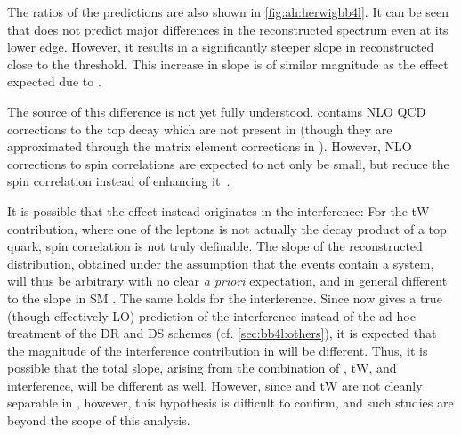 The ratios of the predictions are also shown in \cref{fig:ah:herwigbb4l}. It can be seen that \bbfourl does not predict major differences in the reconstructed \mtt spectrum even at its lower edge. However, it results in a significantly steeper slope in reconstructed \chel close to the threshold. This increase in slope is of similar magnitude as the effect expected due to \etat. 

The source of this difference is not yet fully understood. \bbfourl contains NLO QCD corrections to the top decay which are not present in \hvq (though they are approximated through the matrix element corrections in \pythia). However, NLO corrections to spin correlations are expected to not only be small, but reduce the spin correlation instead of enhancing it~\cite{Bernreuther:2004jv}. 

It is possible that the effect instead originates in the \tttW interference:
For the tW contribution, where one of the leptons is not actually the decay product of a top quark, \ttbar spin correlation is not truly definable. The slope of the reconstructed \chel distribution, obtained under the assumption that the events contain a \ttbar system, will thus be arbitrary with no clear \textit{a priori} expectation, and in general different to the slope in SM \ttbar. The same holds for the \tttW interference. Since \bbfourl now gives a true (though effectively LO) prediction of the \tttW interference instead of the ad-hoc treatment of the DR and DS schemes (cf. \cref{sec:bb4l:others}), it is expected that the magnitude of the interference contribution in \bbfourl will be different. Thus, it is possible that the total \chel slope, arising from the combination of \ttbar, tW, and \tttW interference, will be different as well.
However, since \ttbar and tW are not cleanly separable in \bbfourl, however, this hypothesis is difficult to confirm, and such studies are beyond the scope of this analysis.


